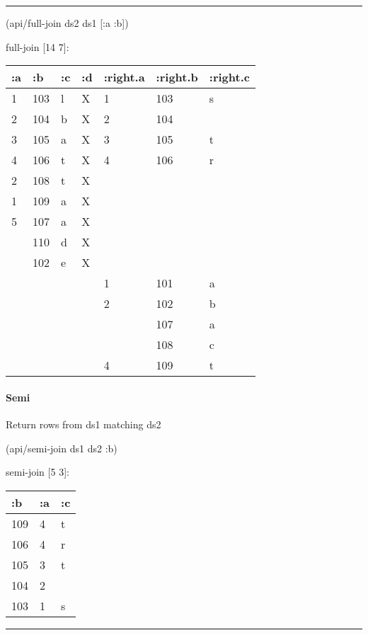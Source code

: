 \documentclass[]{article}
\newenvironment{Shaded}{\begin{snugshade}}{\end{snugshade}}
\newcommand{\AttributeTok}[1]{\textcolor[rgb]{0.77,0.63,0.00}{#1}}
\newcommand{\NormalTok}[1]{#1}
\let\oldparagraph\paragraph
\renewcommand{\paragraph}[1]{\oldparagraph{#1}\mbox{}}
\begin{document}
\begin{center}\rule{0.5\linewidth}{0.5pt}\end{center}

\begin{Shaded}
\begin{Highlighting}[]
\NormalTok{(api/full-join ds2 ds1 [}\AttributeTok{:a} \AttributeTok{:b}\NormalTok{])}
\end{Highlighting}
\end{Shaded}

full-join {[}14 7{]}:

\begin{longtable}[]{@{}lllllll@{}}
\toprule
:a & :b & :c & :d & :right.a & :right.b & :right.c\tabularnewline
\midrule
\endhead
1 & 103 & l & X & 1 & 103 & s\tabularnewline
2 & 104 & b & X & 2 & 104 &\tabularnewline
3 & 105 & a & X & 3 & 105 & t\tabularnewline
4 & 106 & t & X & 4 & 106 & r\tabularnewline
2 & 108 & t & X & & &\tabularnewline
1 & 109 & a & X & & &\tabularnewline
5 & 107 & a & X & & &\tabularnewline
& 110 & d & X & & &\tabularnewline
& 102 & e & X & & &\tabularnewline
& & & & 1 & 101 & a\tabularnewline
& & & & 2 & 102 & b\tabularnewline
& & & & & 107 & a\tabularnewline
& & & & & 108 & c\tabularnewline
& & & & 4 & 109 & t\tabularnewline
\bottomrule
\end{longtable}

\hypertarget{semi}{%
\paragraph{Semi}\label{semi}}

Return rows from ds1 matching ds2

\begin{Shaded}
\begin{Highlighting}[]
\NormalTok{(api/semi-join ds1 ds2 }\AttributeTok{:b}\NormalTok{)}
\end{Highlighting}
\end{Shaded}

semi-join {[}5 3{]}:

\begin{longtable}[]{@{}lll@{}}
\toprule
:b & :a & :c\tabularnewline
\midrule
\endhead
109 & 4 & t\tabularnewline
106 & 4 & r\tabularnewline
105 & 3 & t\tabularnewline
104 & 2 &\tabularnewline
103 & 1 & s\tabularnewline
\bottomrule
\end{longtable}

\begin{center}\rule{0.5\linewidth}{0.5pt}\end{center}
\end{document}

